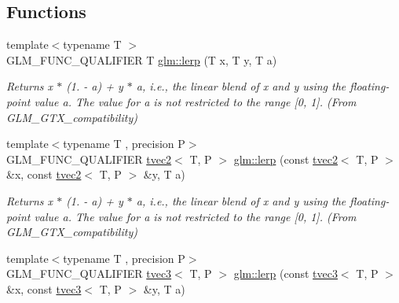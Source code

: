 \subsection*{Functions}
\begin{DoxyCompactItemize}
\item 
\mbox{\label{group__gtx__compatibility_ga5494ba3a95ea6594c86fc75236886864}} 
{\footnotesize template$<$typename T $>$ }\\G\+L\+M\+\_\+\+F\+U\+N\+C\+\_\+\+Q\+U\+A\+L\+I\+F\+I\+ER T \hyperlink{group__gtx__compatibility_ga5494ba3a95ea6594c86fc75236886864}{glm\+::lerp} (T x, T y, T a)
\begin{DoxyCompactList}\small\item\em Returns x $\ast$ (1. -\/ a) + y $\ast$ a, i.\+e., the linear blend of x and y using the floating-\/point value a. The value for a is not restricted to the range \mbox{[}0, 1\mbox{]}. (From G\+L\+M\+\_\+\+G\+T\+X\+\_\+compatibility) \end{DoxyCompactList}\item 
\mbox{\label{group__gtx__compatibility_ga0aa79a146332650a1eb18ae996c653fe}} 
{\footnotesize template$<$typename T , precision P$>$ }\\G\+L\+M\+\_\+\+F\+U\+N\+C\+\_\+\+Q\+U\+A\+L\+I\+F\+I\+ER \hyperlink{structglm_1_1tvec2}{tvec2}$<$ T, P $>$ \hyperlink{group__gtx__compatibility_ga0aa79a146332650a1eb18ae996c653fe}{glm\+::lerp} (const \hyperlink{structglm_1_1tvec2}{tvec2}$<$ T, P $>$ \&x, const \hyperlink{structglm_1_1tvec2}{tvec2}$<$ T, P $>$ \&y, T a)
\begin{DoxyCompactList}\small\item\em Returns x $\ast$ (1. -\/ a) + y $\ast$ a, i.\+e., the linear blend of x and y using the floating-\/point value a. The value for a is not restricted to the range \mbox{[}0, 1\mbox{]}. (From G\+L\+M\+\_\+\+G\+T\+X\+\_\+compatibility) \end{DoxyCompactList}\item 
\mbox{\label{group__gtx__compatibility_gaf4c885ac72b8879b05777cb516c555c9}} 
{\footnotesize template$<$typename T , precision P$>$ }\\G\+L\+M\+\_\+\+F\+U\+N\+C\+\_\+\+Q\+U\+A\+L\+I\+F\+I\+ER \hyperlink{structglm_1_1tvec3}{tvec3}$<$ T, P $>$ \hyperlink{group__gtx__compatibility_gaf4c885ac72b8879b05777cb516c555c9}{glm\+::lerp} (const \hyperlink{structglm_1_1tvec3}{tvec3}$<$ T, P $>$ \&x, const \hyperlink{structglm_1_1tvec3}{tvec3}$<$ T, P $>$ \&y, T a)

\end{DoxyCompactItemize}
